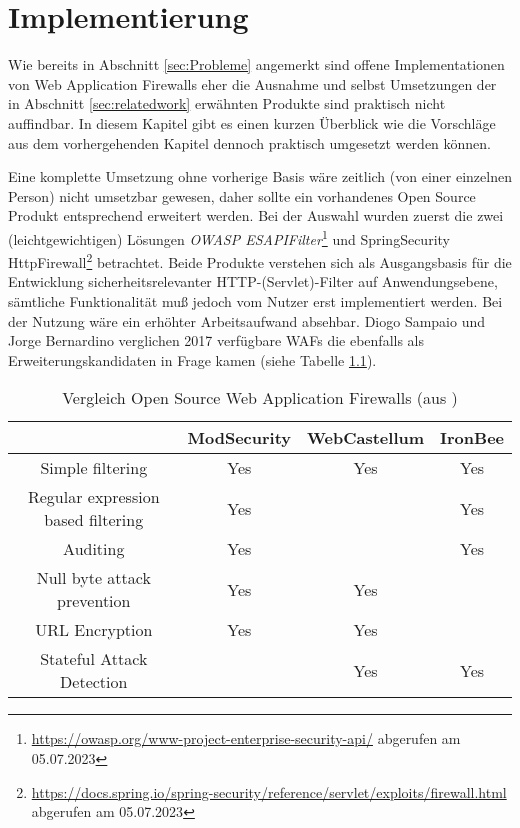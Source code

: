 \chapter{Implementierung}



Wie bereits in Abschnitt \ref{sec:Probleme} angemerkt sind offene Implementationen von Web Application Firewalls eher die Ausnahme und selbst Umsetzungen der in Abschnitt \ref{sec:relatedwork} erwähnten Produkte sind praktisch nicht auffindbar. In diesem Kapitel gibt es einen kurzen Überblick wie die Vorschläge aus dem vorhergehenden Kapitel dennoch praktisch umgesetzt werden können.

Eine komplette Umsetzung ohne vorherige Basis wäre zeitlich (von einer einzelnen Person) nicht umsetzbar gewesen, daher sollte ein vorhandenes Open Source Produkt entsprechend erweitert werden. Bei der Auswahl wurden zuerst die zwei (leichtgewichtigen) Lösungen \emph{OWASP ESAPIFilter}\footnote{\url{https://owasp.org/www-project-enterprise-security-api/} abgerufen am 05.07.2023} und {SpringSecurity HttpFirewall}\footnote{\url{https://docs.spring.io/spring-security/reference/servlet/exploits/firewall.html} abgerufen am 05.07.2023} betrachtet. Beide Produkte verstehen sich als Ausgangsbasis für die Entwicklung sicherheitsrelevanter HTTP-(Servlet)-Filter auf Anwendungsebene, sämtliche Funktionalität muß jedoch vom Nutzer erst implementiert werden. Bei der Nutzung wäre ein erhöhter Arbeitsaufwand absehbar. Diogo Sampaio und Jorge Bernardino verglichen 2017 verfügbare WAFs die ebenfalls als Erweiterungskandidaten in Frage kamen (siehe Tabelle \ref{tab:my_vergos}).


\begin{table}[h]
  \centering
  \begin{tabular}{|c | c | c | c |} 
    \hline
    & \textbf{ModSecurity} & \textbf{WebCastellum} & \textbf{IronBee} \\ [0.5ex] 
    \hline
    Simple filtering & Yes & Yes & Yes \\ 
    \hline
    Regular expression based filtering & Yes &  & Yes \\
    \hline
    Auditing & Yes &  & Yes \\
    \hline
    Null byte attack prevention & Yes & Yes &  \\
    \hline
    URL Encryption & Yes & Yes &  \\ [1ex] 
    \hline
    Stateful Attack Detection & & Yes & Yes \\
    \hline
  \end{tabular}
  \caption{Vergleich Open Source Web Application Firewalls (aus \cite{Sampaio2017}) }
  \label{tab:my_vergos}
\end{table}

